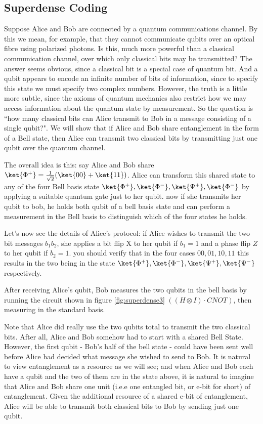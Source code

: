 \documentclass[12pt, oneside]{book}
\theoremstyle{definition}
\theoremstyle{definition}
\theoremstyle{remark}
\begin{document}
\subsection{Superdense Coding}
Suppose Alice and Bob are connected by a quantum communications channel. By this we mean, for example, that they cannot communicate qubits over an optical fibre using polarized photons. Is this, much more powerful than a classical communication channel, over which only classical bits may be transmitted? The answer seems obvious, since a classical bit is a special case of quantum bit. And a qubit appears to encode an infinite number of bits of information, since to specify this state we must specify two complex numbers. However, the truth is a little more subtle, since the axioms of quantum mechanics also restrict how we may access information about the quantum state by measurement. So the question is ``how many classical bits can Alice transmit to Bob in a message consisting of a single qubit?". We will show that if Alice and Bob share entanglement in the form of a Bell state, then Alice can transmit two classical bits by transmitting just one qubit over the quantum channel. 

The overall idea is this: say Alice and Bob share $\ket{\Phi^{+}}=\frac{1}{\sqrt{2}}(\ket{00}+\ket{11})$. Alice can transform this shared state to any of the four Bell basis state $\ket{\Phi^{+}},\ket{\Phi^{-}},\ket{\Psi^{+}},\ket{\Phi^{-}}$ by applying a suitable quantum gate just to her qubit. now if she transmits her qubit to bob, he holds both qubit of a bell basis state and can perform a measurement in the Bell basis to distinguish which of the four states he holds.

Let's now see the details of Alice's protocol: if Alice wishes to transmit the two bit messages $b_1b_2$, she applies a bit flip X to her qubit if $b_1=1$ and a phase flip $Z$ to her qubit if $b_2=1$. you should verify that in the four cases $00,01,10,11$ this results in the two being in the state $\ket{\Phi^{+}},\ket{\Phi^{-}},\ket{\Psi^{+}},\ket{\Psi^{-}}$ respectively.

After receiving Alice's qubit, Bob measures the two qubits in the bell basis by running the circuit shown in figure \ref{fig:superdense3} $((H\otimes I) \cdot CNOT)$, then measuring in the standard basis.

Note that Alice did really use the two qubits total to transmit the two classical bits. After all, Alice and Bob somehow had to start with a shared Bell State. However, the first qubit - Bob's half of the bell state - could have been sent well before Alice had decided what message she wished to send to Bob. It is natural to view entanglement as a resource as we will see; and when Alice and Bob each have a qubit and the two of them are in the state above, it is natural to imagine that Alice and Bob share one unit (i.e.e one entangled bit, or e-bit for short) of entanglement. Given the additional resource of a shared e-bit of entanglement, Alice will be able to transmit both classical bits to Bob by sending just one qubit.
\end{document}

